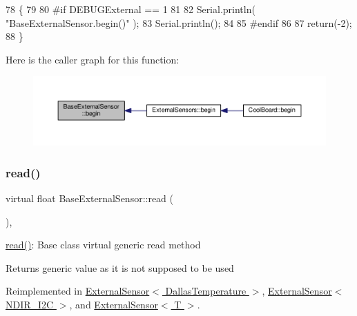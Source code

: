 \begin{DoxyCode}
78     \{
79     
80 \textcolor{preprocessor}{    #if DEBUGExternal == 1 }
81     
82         Serial.println( \textcolor{stringliteral}{"BaseExternalSensor.begin()"} );
83         Serial.println();
84     
85 \textcolor{preprocessor}{    #endif}
86 
87         \textcolor{keywordflow}{return}(-2);
88     \}
\end{DoxyCode}
Here is the caller graph for this function\+:\nopagebreak
\begin{figure}[H]
\begin{center}
\leavevmode
\includegraphics[width=350pt]{d1/d68/class_base_external_sensor_a87d132803d4f4fdd4e66332809f0c9a0_icgraph}
\end{center}
\end{figure}
\mbox{\label{class_base_external_sensor_a1564f16deacf57b51b9948ac29db4291}} 
\subsubsection{\texorpdfstring{read()}{read()}}
{\footnotesize\ttfamily virtual float Base\+External\+Sensor\+::read (\begin{DoxyParamCaption}{ }\end{DoxyParamCaption})\hspace{0.3cm}{\ttfamily [inline]}, {\ttfamily [virtual]}}

\hyperlink{class_base_external_sensor_a1564f16deacf57b51b9948ac29db4291}{read()}\+: Base class virtual generic read method

\begin{DoxyReturn}{Returns}
generic value as it is not supposed to be used 
\end{DoxyReturn}


Reimplemented in \hyperlink{class_external_sensor_3_01_dallas_temperature_01_4_a1e725d9338314515d4e5dc456ed6a6c8}{External\+Sensor$<$ Dallas\+Temperature $>$}, \hyperlink{class_external_sensor_3_01_n_d_i_r___i2_c_01_4_a239d18652e9fb4673842ae9726edf44f}{External\+Sensor$<$ N\+D\+I\+R\+\_\+\+I2\+C $>$}, and \hyperlink{class_external_sensor_a5fb3afc7d244fb86dac68ab5481bc407}{External\+Sensor$<$ T $>$}.



